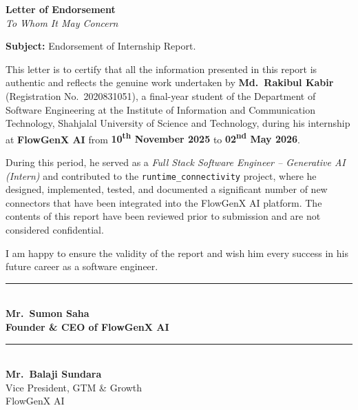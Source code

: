 \thispagestyle{empty}
\noindent
\begin{center}
    {\Large \textbf{Letter of Endorsement}} \\[0.2cm]
    \emph{To Whom It May Concern}
\end{center}

\vspace{0.8cm}

\noindent
\textbf{Subject:} Endorsement of Internship Report.

\vspace{0.5cm}

\noindent
This letter is to certify that all the information presented in this
report is authentic and reflects the genuine work undertaken by
\textbf{Md.~Rakibul Kabir} (Registration No.~2020831051), a final-year
student of the Department of Software Engineering at the Institute of
Information and Communication Technology, Shahjalal University of Science
and Technology, during his internship at \textbf{FlowGenX AI} from
\textbf{10\textsuperscript{th} November 2025} to
\textbf{02\textsuperscript{nd} May 2026}.

\vspace{0.3cm}

\noindent
During this period, he served as a \emph{Full Stack Software Engineer --
Generative AI (Intern)} and contributed to the \texttt{runtime\_connectivity}
project, where he designed, implemented, tested, and documented a
significant number of new connectors that have been integrated into the
FlowGenX AI platform. The contents of this report have been reviewed
prior to submission and are not considered confidential.

\vspace{0.3cm}

\noindent
I am happy to ensure the validity of the report and wish him every
success in his future career as a software engineer.

\vspace{0.8cm}

\noindent
\begin{minipage}[t]{0.45\textwidth}
\centering
\rule{0pt}{1.6cm}\par
\rule{6cm}{0.4pt} \\[0.2cm]
\textbf{Mr.~Sumon Saha} \\
\textbf{Founder \& CEO of FlowGenX AI}
\end{minipage}
\hfill
\begin{minipage}[t]{0.45\textwidth}
\centering
\rule{0pt}{1.6cm}\par
\rule{6cm}{0.4pt} \\[0.2cm]
\textbf{Mr.~Balaji Sundara} \\
Vice President, GTM \& Growth \\
FlowGenX AI
\end{minipage}


